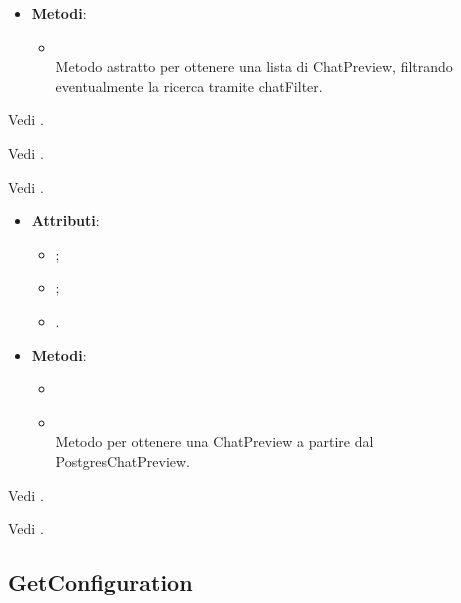 \documentclass[10pt, a4paper]{article}
\begin{document}
\label{GetChatsUseCaseDettaglio}
\begin{itemize}
    \item \textbf{Metodi}:
    \begin{itemize}
        \item {}\\
        Metodo astratto per ottenere una lista di ChatPreview, filtrando eventualmente la ricerca tramite chatFilter.
    \end{itemize}
\end{itemize}


Vedi .

Vedi .



Vedi .


\label{PostgresChatPreviewDettaglio}
\begin{itemize}
    \item \textbf{Attributi}:
    \begin{itemize}
        \item {};
        \item {};
        \item {}.
    \end{itemize}
    \item \textbf{Metodi}:
    \begin{itemize}
        \item \item {}\\ 
        Metodo per ottenere una ChatPreview a partire dal PostgresChatPreview.
    \end{itemize}
\end{itemize}


Vedi .


Vedi .


\subsection{GetConfiguration}
\end{document}
